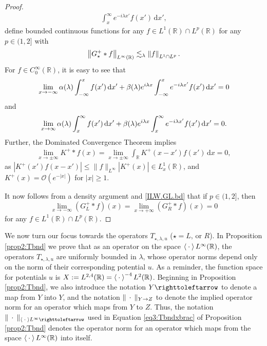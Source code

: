 \documentclass[../dissertation]{subfiles}
\begin{document}
\begin{proof}
\begin{align}
						\int_x^{\infty} e^{-i\lambda x'} f(x') \, \mathrm{d}x', 
				\nonumber
	\end{align}
	define bounded continuous functions for any 
	$f \in L^1(\mathbb R) \cap L^p(\mathbb R)$ for any $p \in (1,2]$ with
	\begin{equation}
		\label{ILW.GL.bd}
		\norm[L^\infty(\mathbb R)]{G_\star^+*f} \lesssim_\lambda \norm[L^1 \cap L^p]{f}.
	\end{equation}
	For $f \in C_0^\infty(\mathbb R)$, it is easy to see that
	\begin{align*}
		\lim_{x\to-\infty} \alpha (\lambda) \int_{-\infty}^x f(x') \, \mathrm{d}x' 
				+ \beta(\lambda) e^{i\lambda x} 
						\int_{-\infty}^x e^{-i\lambda x'} f(x') \, \mathrm{d}x'
				= 0
	\end{align*}
	and 
	\begin{align*}
		\lim_{x\to\infty}
				\alpha (\lambda) \int_x^{\infty} f(x') \, \mathrm{d}x' 
				+  \beta(\lambda) e^{i\lambda x} 
						\int_x^{\infty} e^{-i\lambda x'} f(x') \, \mathrm{d}x'
			= 0.
	\end{align*}
	Further, the Dominated Convergence Theorem implies 
	\begin{align*}
		\lim_{x\to \pm \infty} K^+*f(x) 
			= \lim_{x\to \pm \infty} \int_{\mathbb R} K^+(x-x') f(x') \, \mathrm{d}x
			= 0,
	\end{align*}
	as $|K^+(x') f(x-x')| \leq \|f\|_{L^\infty} |K^+(x)| \in L_x^1(\mathbb R)$,
	and $K^+(x) = \mathcal O\left(e^{-|x|}\right)$ for $|x| \geq 1$. 



	It now follows from a density 
	argument and \eqref{ILW.GL.bd} that if $p \in (1,2]$, then
	\begin{equation}
		\label{ILW.GL.vanish}
		\lim_{x \to -\infty} \left(G_L^+*f\right)(x) 
			= \lim_{x \to +\infty} \left(G_R^+*f\right)(x) 
			= 0
	\end{equation}
	for any $f \in L^1(\mathbb R) \cap L^p(\mathbb R)$.
\end{proof}

We now turn our focus towards the operators $T_{\star, \lambda, u}$
($\star = L \text{, or } R$). In Proposition \ref{prop2:Tbnd} we prove that as 
an operator on the space $\left\langle \kern 0.5ex \cdot \kern 0.5ex \right\rangle L^\infty(\mathbb R)$, the operators 
$T_{\star, \lambda, u}$ are uniformly bounded in $\lambda$, whose operator norms 
depend only on the norm of their corresponding potential $u$. As a reminder, the 
function space for potentials $u$ is 
$X:=L^{2, 4}(\mathbb R) = \left\langle \kern 0.5ex \cdot \kern 0.5ex \right\rangle^{-4} L^2(\mathbb R)$. Beginning in
Proposition \ref{prop2:Tbnd}, we also introduce the notation 
$Y\toitself$\label{sym:toitself} to
denote a map from $Y$ into $Y$, and the notation 
$\|\kern 0.5ex \cdot \kern 0.5ex\|_{Y\to Z}$\label{sym:opnorm} to
denote the implied operator norm for an operator which maps from $Y$ to $Z$.
Thus, the notation $\|\dotarg\|_{\inn{\dotarg}L^\infty\toitself}$ used in 
Equation \eqref{eq3:Tbndxbrac} of Proposition \ref{prop2:Tbnd} denotes the 
operator norm for an operator which maps from the space 
$\left\langle \kern 0.5ex \cdot \kern 0.5ex \right\rangle L^\infty(\mathbb R)$ into itself.
\end{document}

